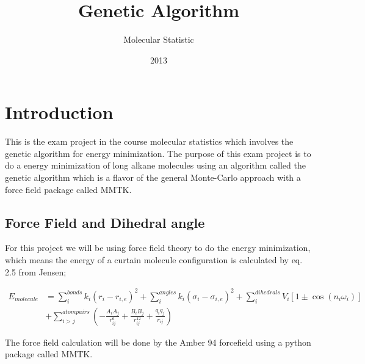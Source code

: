 \documentclass{article}
\title{Genetic Algorithm}
\author{Molecular Statistic}
\date{2013}
\begin{document}


\maketitle

\section{Introduction}

This is the exam project in the course molecular statistics which involves the genetic algorithm
for energy minimization.
The purpose of this exam
project is to do a energy
minimization of long alkane molecules using an algorithm called the genetic algorithm which
is a flavor of the general Monte-Carlo approach with a force field package called MMTK.

\subsection{Force Field and Dihedral angle}

For this project we will be using force field theory to do
the energy minimization, which means the energy of a curtain
molecule configuration is calculated by eq. 2.5 from Jensen;

\begin{align}
    E_{molecule}
    &= \sum^{bonds}_i k_i (r_i - r_{i,e})^2
    + \sum^{angles}_i k_i ( \sigma_i - \sigma_{i,e})^2
    + \sum^{dihedrals}_i V_i [1 \pm \cos (n_i \omega_i) ] \nonumber \\
    &+ \sum^{atom pairs}_{i>j} \left ( -\frac{A_iA_j}{r^6_{ij}} + \frac{B_iB_j}{r^12_{ij}} + \frac{q_iq_j}{r_{ij}} \right )
    \label{eq:amber}
\end{align}


The force field calculation will be done by the Amber 94 forcefield
using a python package called MMTK.
\end{document}
